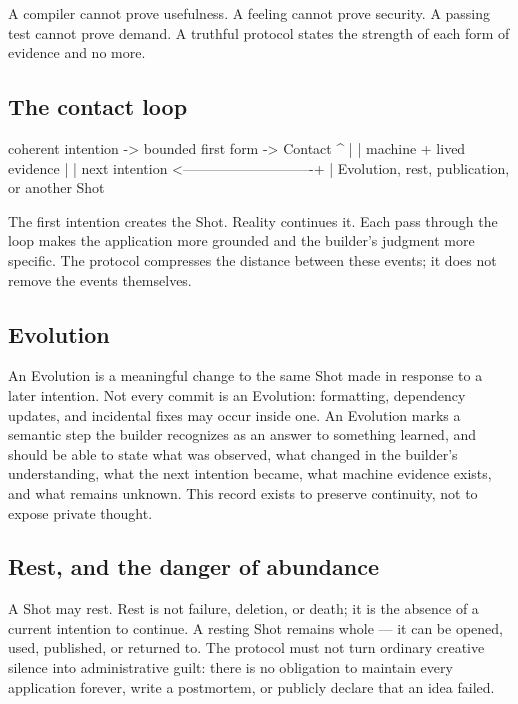 \documentclass[11pt]{article}
\begin{document}
A compiler cannot prove usefulness. A feeling cannot prove security. A
passing test cannot prove demand. A truthful protocol states the
strength of each form of evidence and no more.

\subsection{The contact loop}

\begin{proto}
coherent intention -> bounded first form -> Contact
       ^                                       |
       |                             machine + lived evidence
       |                                       |
  next intention  <----------------------------+
       |
  Evolution, rest, publication, or another Shot
\end{proto}

The first intention creates the Shot. Reality continues it. Each pass
through the loop makes the application more grounded and the builder's
judgment more specific. The protocol compresses the distance between
these events; it does not remove the events themselves.

\subsection{Evolution}

An Evolution is a meaningful change to the same Shot made in response to
a later intention. Not every commit is an Evolution: formatting,
dependency updates, and incidental fixes may occur inside one. An
Evolution marks a semantic step the builder recognizes as an answer to
something learned, and should be able to state what was observed, what
changed in the builder's understanding, what the next intention became,
what machine evidence exists, and what remains unknown. This record
exists to preserve continuity, not to expose private thought.

\subsection{Rest, and the danger of abundance}

A Shot may rest. Rest is not failure, deletion, or death; it is the
absence of a current intention to continue. A resting Shot remains whole
--- it can be opened, used, published, or returned to. The protocol must
not turn ordinary creative silence into administrative guilt: there is
no obligation to maintain every application forever, write a postmortem,
or publicly declare that an idea failed.
\end{document}
